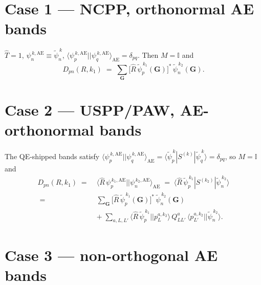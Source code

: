 \documentclass[11pt]{article}
\newcommand{\matel}[3]{\langle #1 | #2 | #3 \rangle}
\newcommand{\AEt}{\mathrm{AE}}
\newcommand{\rotpsiAE}[2]{\hat{R}\,\psi_{#1}^{\,#2,\AEt}}
\newcommand{\psiAE}[2]{\psi_{#1}^{\,#2,\AEt}}
\newcommand{\rotpsipt}[2]{\hat{R}\,\widetilde{\psi}_{#1}^{\,#2}}
\newcommand{\psipt}[2]{\widetilde{\psi}_{#1}^{\,#2}}
\begin{document}
\section*{Case 1 --- NCPP, orthonormal AE bands}

$\widehat{T} = 1$, $\psiAE{n}{k} \equiv \psipt{n}{k}$,
$\matel{\psiAE{p}{k}}{}{\psiAE{q}{k}}_{\AEt} = \delta_{pq}$. Then
$M = \mathbb{I}$ and
\begin{equation}
  \boxed{
  D_{pn}(R, k_1)
  \;=\; \sum_{\mathbf{G}}
        \big[\rotpsipt{p}{k_1}(\mathbf{G})\big]^{*}\,
        \psipt{n}{k_2}(\mathbf{G}).
  }
  \label{eq:D-orth}
\end{equation}

\section*{Case 2 --- USPP/PAW, AE-orthonormal bands}

The QE-shipped bands satisfy
$\matel{\psiAE{p}{k}}{}{\psiAE{q}{k}}_{\AEt}
= \matel{\psipt{p}{k}}{S^{(k)}}{\psipt{q}{k}}
= \delta_{pq}$, so $M = \mathbb{I}$ and
\begin{equation}
  \boxed{
  \begin{aligned}
  D_{pn}(R, k_1)
  \;=\; & \matel{\rotpsiAE{p}{k_1}}{}{\psiAE{n}{k_2}}_{\AEt}
  \;=\; \matel{\rotpsipt{p}{k_1}}{S^{(k_2)}}{\psipt{n}{k_2}}
  \\[2pt]
  \;=\; & \sum_{\mathbf{G}}
        \big[\rotpsipt{p}{k_1}(\mathbf{G})\big]^{*}\,
        \psipt{n}{k_2}(\mathbf{G})
  \\[2pt]
  & +\;
  \sum_{a, L, L'}
        \matel{\rotpsipt{p}{k_1}}{}{p_L^{a, k_2}}\,
        Q^a_{LL'}\,
        \matel{p_{L'}^{a, k_2}}{}{\psipt{n}{k_2}}.
  \end{aligned}
  }
  \label{eq:D-paw}
\end{equation}

\section*{Case 3 --- non-orthogonal AE bands}
\end{document}
